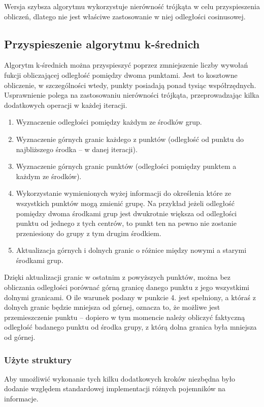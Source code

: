 \documentclass{article}
\begin{document}
Wersja szybsza algorytmu wykorzystuje nierówność trójkąta w celu przyspieszenia obliczeń, dlatego nie jest właściwe zastosowanie w niej odległości cosinusowej.

\subsection{Przyspieszenie algorytmu k-średnich}
Algorytm k-średnich można przyspieszyć poprzez zmniejszenie liczby wywołań fukcji obliczającej odległość pomiędzy dwoma punktami. Jest to kosztowne obliczenie, w szczególności wtedy, punkty posiadają ponad tysiąc współrzędnych. Usprawnienie polega na zastosowaniu nierówności trójkąta, przeprowadzając kilka dodatkowych operacji w każdej iteracji.

\begin{enumerate}
	\item Wyznaczenie odległości pomiędzy każdym ze środków grup.
	\item Wyznaczenie górnych granic każdego z punktów (odległość od punktu do najbliższego środka – w danej iteracji).
	\item Wyznaczenie górnych granic punktów (odległości pomiędzy punktem a każdym ze środków).
	\item Wykorzystanie wymienionych wyżej informacji do określenia które ze wszystkich punktów mogą zmienić grupę. Na przykład jeżeli odległość pomiędzy dwoma środkami grup jest dwukrotnie większa od odległości punktu od jednego z tych centrów, to punkt ten na pewno nie zostanie przeniesiony do grupy z tym drugim środkiem.
	\item Aktualizacja górnych i dolnych granic o różnice między nowymi a starymi środkami grup.
\end{enumerate}

Dzięki aktualizacji granic w ostatnim z powyższych punktów, można bez obliczania odległości porównać górną granicę danego punktu z jego wszystkimi dolnymi granicami. O ile warunek podany w punkcie 4. jest spełniony, a któraś z dolnych granic będzie mniejsza od górnej, oznacza to, że możliwe jest przemieszczenie punktu – dopiero w tym momencie należy obliczyć faktyczną odległość badanego punktu od środka grupy, z którą dolna granica była mniejsza od górnej.

\subsubsection{Użyte struktury}
Aby umożliwić wykonanie tych kilku dodatkowych kroków niezbędna było dodanie względem standardowej implementacji różnych pojemników na informacje.
\end{document}
